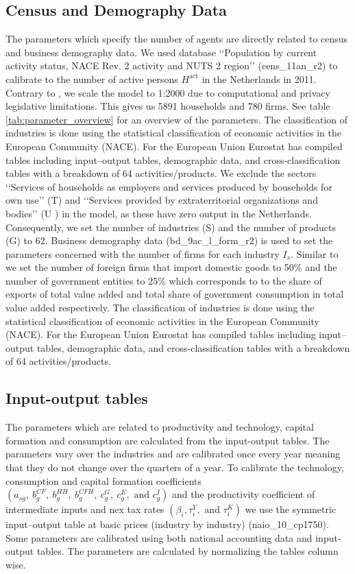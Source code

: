 \subsection{Census and Demography Data}
The parameters which specify the number of agents are directly related to census and business demography data.  We used database ‘‘Population by current activity status, NACE Rev. 2 activity and NUTS 2 region’’ (cens\_11an\_r2) to calibrate  to the number of active persons $H^{\text{act}}$ in the Netherlands in 2011. Contrary to \cite{poledna_economic_2019}, we scale the model to 1:2000 due to computational and privacy legislative limitations. This gives us 5891 households and 780 firms. See table \ref{tab:parameter_overview} for an overview of the parameters. The classification of industries is done using the statistical classification of economic activities in the European Community (NACE). For the European Union Eurostat has compiled  tables including input–output tables, demographic data, and cross-classification tables with a breakdown of 64 activities/products. We exclude the sectors ‘‘Services of households as employers and services produced by households for own use’’ (T) and ‘‘Services provided by extraterritorial organizations and bodies’’ (U ) in the model, as these have zero output in the Netherlands. Consequently, we set the number of industries (S) and the number of products (G) to 62. Business demography data (bd\_9ac\_l\_form\_r2) is used to set the parameters concerned with the number of firms for each industry $I_s$. Similar to \cite{poledna_economic_2019} we set the number of foreign firms that import domestic goods to 50\% and the number of government entities to 25\% which corresponds to to the share of exports of total value added and total share of government consumption in total value added respectively.
The classification of industries is done using the statistical classification of economic activities in the European Community (NACE). For the European Union Eurostat has compiled  tables including input–output tables, demographic data, and cross-classification tables with a breakdown of 64 activities/products.
\subsection{Input-output tables}
The parameters which are related to productivity and technology, capital formation and consumption are calculated from the input-output tables. The parameters vary over the industries and are calibrated once every year meaning that they do not change over the quarters of a year. To calibrate the technology, consumption and capital formation coefficients
$(a_{sg}, \ b_g^{CF}, \ b_g^{HH}, \ b_g^{CFH}, \ c_g^G, \ c_g^E,\text{ and }c_g^I)$ and the productivity coefficient of intermediate inputs and nex tax rates $(\beta_i, \tau_i^Y, \text{ and } \tau_i^K)$ we use the symmetric input–output table at basic prices (industry by industry) (naio\_10\_cp1750). Some parameters are calibrated using both national accounting data and input-output tables. The parameters are calculated by normalizing the tables column wise.\\


